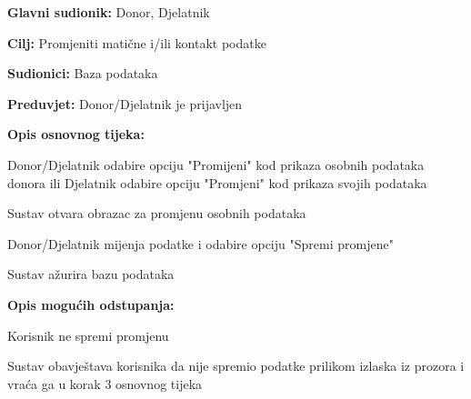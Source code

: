 					\begin{packed_item}
	
						\item \textbf{Glavni sudionik: }Donor, Djelatnik
						\item \textbf{Cilj:} Promjeniti matične i/ili kontakt podatke
						\item \textbf{Sudionici:} Baza podataka
						\item \textbf{Preduvjet:} Donor/Djelatnik je prijavljen
						\item \textbf{Opis osnovnog tijeka:}
						
						\item[] \begin{packed_enum}
	
							\item Donor/Djelatnik odabire opciju "Promijeni" kod prikaza osobnih podataka donora ili Djelatnik odabire opciju "Promjeni" kod prikaza svojih podataka
							\item Sustav otvara obrazac za promjenu osobnih podataka
							\item Donor/Djelatnik mijenja podatke i odabire opciju "Spremi promjene"
							
							\item Sustav ažurira bazu podataka
							
						\end{packed_enum}

						\item  \textbf{Opis mogućih odstupanja:}
						
						\item[] \begin{packed_item}
	
							\item[3.a] Korisnik ne spremi promjenu
							\item[] \begin{packed_enum}
								
								\item  Sustav obavještava korisnika da nije spremio podatke prilikom izlaska iz prozora i vraća ga u korak 3 osnovnog tijeka
							 

								
									\end{packed_enum}
								\end{packed_item}
					\end{packed_item}
\noindent {}
